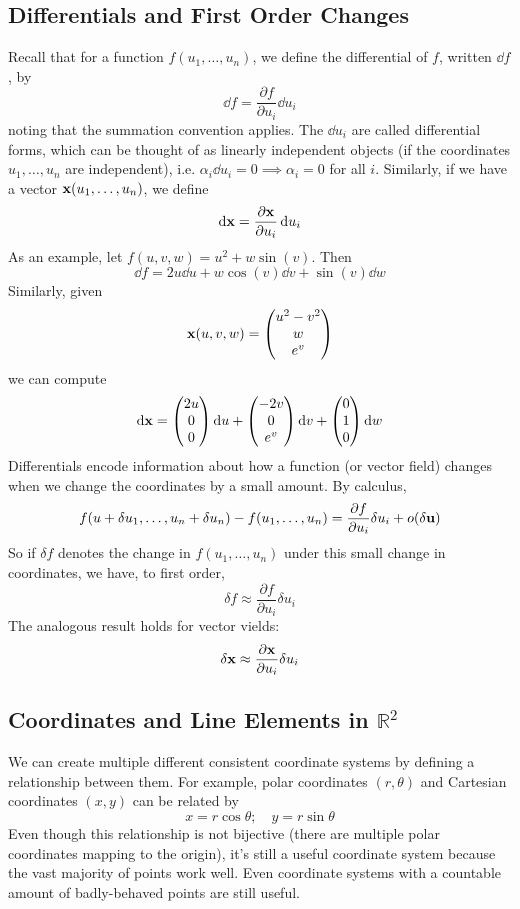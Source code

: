 \subsection{Differentials and First Order Changes}
Recall that for a function \(f(u_1, \dots, u_n)\), we define the differential of \(f\), written \(\dd{f}\), by
\[ \dd{f} = \frac{\partial f}{\partial u_i} \dd{u}_i \]
noting that the summation convention applies. The \(\dd{u}_i\) are called differential forms, which can be thought of as linearly independent objects (if the coordinates \(u_1, \dots, u_n\) are independent), i.e. \(\alpha_i \dd{u}_i = 0 \implies \alpha_i = 0\) for all \(i\). Similarly, if we have a vector \(\vb x(u_1, \dots, u_n)\), we define
\[ \dd \vb x = \frac{\partial \vb x}{\partial u_i} \dd{u}_i \]
As an example, let \(f(u, v, w) = u^2 + w \sin(v)\). Then
\[ \dd{f} = 2u \dd{u} + w \cos(v) \dd{v} + \sin(v) \dd{w} \]
Similarly, given
\[ \vb x(u, v, w) = \begin{pmatrix}
		u^2 - v^2 \\ w \\ e^v
	\end{pmatrix} \]
we can compute
\[ \dd \vb x = \begin{pmatrix}
		2u \\ 0 \\ 0
	\end{pmatrix} \dd{u} + \begin{pmatrix}
		-2v \\ 0 \\ e^v
	\end{pmatrix} \dd{v} + \begin{pmatrix}
		0 \\ 1 \\ 0
	\end{pmatrix} \dd{w} \]
Differentials encode information about how a function (or vector field) changes when we change the coordinates by a small amount. By calculus,
\[ f(u + \delta u_1, \dots, u_n + \delta u_n) - f(u_1, \dots, u_n) = \frac{\partial f}{\partial u_i} \delta u_i + o(\delta \vb u) \]
So if \(\delta f\) denotes the change in \(f(u_1, \dots, u_n)\) under this small change in coordinates, we have, to first order,
\[ \delta f \approx \frac{\partial f}{\partial u_i}\delta u_i \]
The analogous result holds for vector vields:
\[ \delta \vb x \approx \frac{\partial \vb x}{\partial u_i}\delta u_i \]

\subsection{Coordinates and Line Elements in \(\mathbb R^2\)}
We can create multiple different consistent coordinate systems by defining a relationship between them. For example, polar coordinates \((r, \theta)\) and Cartesian coordinates \((x, y)\) can be related by
\[ x = r \cos \theta;\quad y = r \sin \theta \]
Even though this relationship is not bijective (there are multiple polar coordinates mapping to the origin), it's still a useful coordinate system because the vast majority of points work well. Even coordinate systems with a countable amount of badly-behaved points are still useful.

